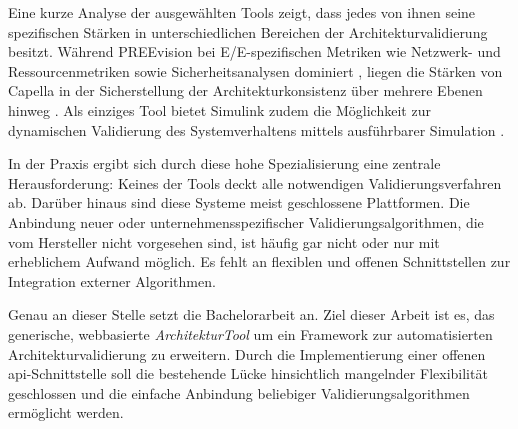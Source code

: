 Eine kurze Analyse der ausgewählten Tools zeigt, dass jedes von ihnen seine spezifischen Stärken in unterschiedlichen Bereichen der Architekturvalidierung besitzt. Während PREEvision bei E/E-spezifischen Metriken wie Netzwerk- und Ressourcenmetriken sowie Sicherheitsanalysen dominiert \cite{schauffele2016architectural}, liegen die Stärken von Capella in der Sicherstellung der Architekturkonsistenz über mehrere Ebenen hinweg \cite{roques2016mbse}. Als einziges Tool bietet Simulink zudem die Möglichkeit zur dynamischen Validierung des Systemverhaltens mittels ausführbarer Simulation \cite{The24}.

In der Praxis ergibt sich durch diese hohe Spezialisierung eine zentrale Herausforderung: Keines der Tools deckt alle notwendigen Validierungsverfahren ab. Darüber hinaus sind diese Systeme meist geschlossene Plattformen. Die Anbindung neuer oder unternehmensspezifischer Validierungsalgorithmen, die vom Hersteller nicht vorgesehen sind, ist häufig gar nicht oder nur mit erheblichem Aufwand möglich. Es fehlt an flexiblen und offenen Schnittstellen zur Integration externer Algorithmen.

\break
Genau an dieser Stelle setzt die Bachelorarbeit an. Ziel dieser Arbeit ist es, das generische, webbasierte \textit{ArchitekturTool} um ein Framework zur automatisierten Architekturvalidierung zu erweitern. Durch die Implementierung einer offenen \gls{api}-Schnittstelle soll die bestehende Lücke hinsichtlich mangelnder Flexibilität geschlossen und die einfache Anbindung beliebiger Validierungsalgorithmen ermöglicht werden.

